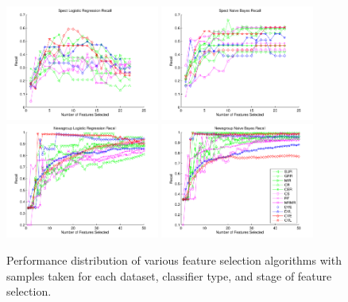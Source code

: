 \begin{figure}[tbp!]
\centering
\includegraphics[width=0.45\textwidth]{./figures/linegraphs/SpectLogisticRegressionRecall.pdf}
\includegraphics[width=0.45\textwidth]{./figures/linegraphs/SpectNaiveBayesRecall.pdf}\\
\includegraphics[width=0.45\textwidth]{./figures/linegraphs/NewsgroupLogisticRegressionRecall.pdf}
\includegraphics[width=0.45\textwidth]{./figures/linegraphs/NewsgroupNaiveBayesRecall.pdf}
\caption{\footnotesize Performance distribution of various feature selection algorithms with samples taken for each dataset, classifier type, and stage of feature selection.}
\label{fig:perf_vs_fs_alg}
\end{figure}

